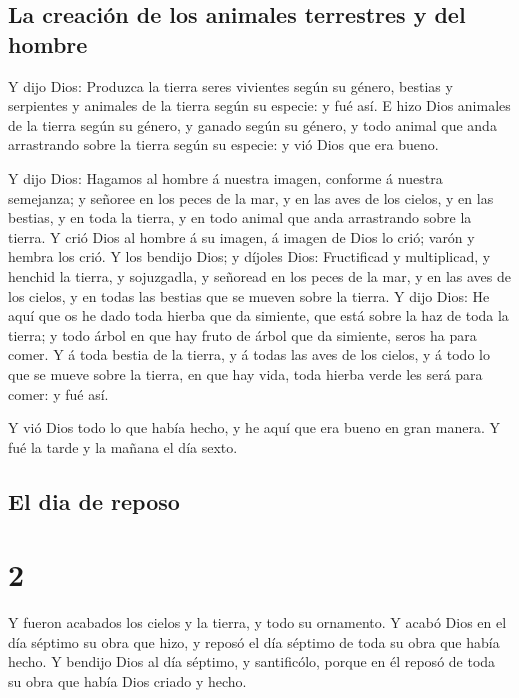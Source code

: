 \hypertarget{la-creaciuxf3n-de-los-animales-terrestres-y-del-hombre}{%
\subsection{La creación de los animales terrestres y del
hombre}\label{la-creaciuxf3n-de-los-animales-terrestres-y-del-hombre}}

 Y dijo Dios: Produzca la tierra seres vivientes según su
género, bestias y serpientes y animales de la tierra según su especie: y
fué así.  E hizo Dios animales de la tierra según su
género, y ganado según su género, y todo animal que anda arrastrando
sobre la tierra según su especie: y vió Dios que era bueno.

 Y dijo Dios: Hagamos al hombre á nuestra imagen,
conforme á nuestra semejanza; y señoree en los peces de la mar, y en las
aves de los cielos, y en las bestias, y en toda la tierra, y en todo
animal que anda arrastrando sobre la tierra.  Y crió Dios
al hombre á su imagen, á imagen de Dios lo crió; varón y hembra los
crió.  Y los bendijo Dios; y díjoles Dios: Fructificad y
multiplicad, y henchid la tierra, y sojuzgadla, y señoread en los peces
de la mar, y en las aves de los cielos, y en todas las bestias que se
mueven sobre la tierra.  Y dijo Dios: He aquí que os he
dado toda hierba que da simiente, que está sobre la haz de toda la
tierra; y todo árbol en que hay fruto de árbol que da simiente, seros ha
para comer.  Y á toda bestia de la tierra, y á todas las
aves de los cielos, y á todo lo que se mueve sobre la tierra, en que hay
vida, toda hierba verde les será para comer: y fué así.

 Y vió Dios todo lo que había hecho, y he aquí que era
bueno en gran manera. Y fué la tarde y la mañana el día sexto.

\hypertarget{el-dia-de-reposo}{%
\subsection{El dia de reposo}\label{el-dia-de-reposo}}

\hypertarget{section-1}{%
\section{2}\label{section-1}}

 Y fueron acabados los cielos y la tierra, y todo su
ornamento.  Y acabó Dios en el día séptimo su obra que
hizo, y reposó el día séptimo de toda su obra que había hecho.
 Y bendijo Dios al día séptimo, y santificólo, porque en
él reposó de toda su obra que había Dios criado y hecho.

